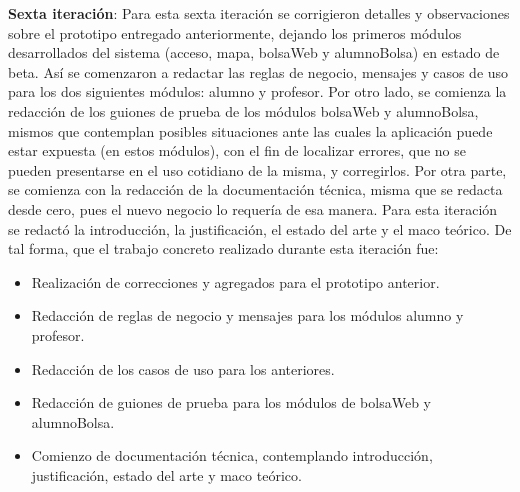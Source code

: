 \noindent
\newline
\textbf{Sexta iteración}: Para esta sexta iteración se corrigieron detalles y observaciones sobre el prototipo entregado anteriormente, dejando los primeros módulos desarrollados del sistema (acceso, mapa, bolsaWeb y alumnoBolsa) en estado de beta. Así se comenzaron a redactar las reglas de negocio, mensajes y casos de uso para los dos siguientes módulos: alumno y profesor. Por otro lado, se comienza la redacción de los guiones de prueba de los módulos bolsaWeb y alumnoBolsa, mismos que contemplan posibles situaciones ante las cuales la aplicación puede estar expuesta (en estos módulos), con el fin de localizar errores, que no se pueden presentarse en el uso cotidiano de la misma, y corregirlos.
\newline
Por otra parte, se comienza con la redacción de la documentación técnica, misma que se redacta desde cero, pues el nuevo negocio lo requería de esa manera. Para esta iteración se redactó la introducción, la justificación, el estado del arte y el maco teórico.
\newline
De tal forma, que el trabajo concreto realizado durante esta iteración fue:
\begin{itemize}
	\item Realización de correcciones y agregados para el prototipo anterior.
	\item Redacción de reglas de negocio y mensajes para los módulos alumno y profesor.
	\item Redacción de los casos de uso para los anteriores.
	\item Redacción de guiones de prueba para los módulos de bolsaWeb y alumnoBolsa.
	\item Comienzo de documentación técnica, contemplando introducción, justificación, estado del arte y maco teórico.
\end{itemize}


